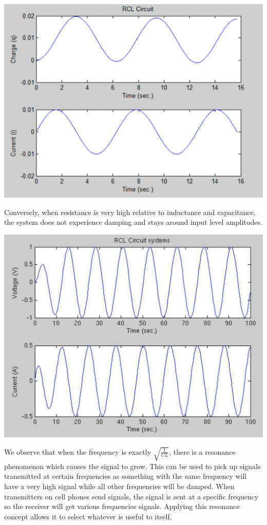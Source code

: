 \documentclass[titlepage,12pt]{article}
\begin{document}
\begin{center}
        \includegraphics[scale=0.6]{rcl-highr.png}
\end{center}

\noindent Conversely, when resistance is very high relative to inductance and capacitance, the system does not experience damping and stays around input level amplitudes.

\begin{center}
        \includegraphics[scale=0.6]{resonance.png}
\end{center}

\noindent We observe that when the frequency is exactly $\sqrt{\frac{1}{CL}}$, there is a resonance phenomenon which causes the signal to grow. This can be used to pick up signals transmitted at certain frequencies as something with the same frequency will have a very high signal while all other frequencies will be damped. When transmitters on cell phones send signals, the signal is sent at a specific frequency so the receiver will get various frequencies signals. Applying this resonance concept allows it to select whatever is useful to itself.
\end{document}
